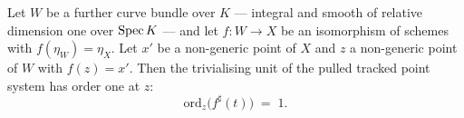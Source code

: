 \begin{lemma}
  \label{pa-lem:ordZ_pointPullbackUnit}
  \leanok

  Let \(W\) be a further curve bundle over \(K\) --- integral and smooth of relative
  dimension one over \(\operatorname{Spec} K\) --- and let \(f : W \to X\) be an isomorphism of
  schemes with \(f(\eta_W) = \eta_X\). Let \(x'\) be a non-generic point of \(X\) and
  \(z\) a non-generic point of \(W\) with \(f(z) = x'\). Then the trivialising unit of
  the pulled tracked point system has order one at \(z\):
  \[
    \mathrm{ord}_z\bigl(f^{\sharp}(t)\bigr) \;=\; 1.
  \]
\end{lemma}
